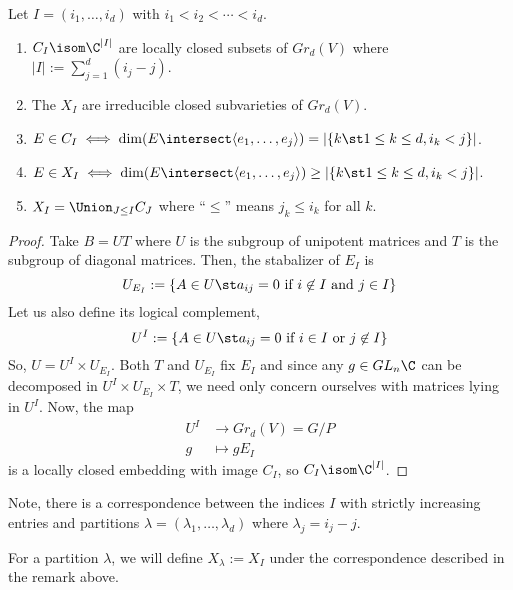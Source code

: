 \documentclass[11pt,leqno,oneside]{amsbook}
\numberwithin{thm}{section}
\newcommand{\Gr}{Gr}
\begin{document}
\begin{prop}
  Let \(I = (i_1, \ldots, i_d)\) with \(i_1 < i_2 < \cdots <
  i_d\). 
  \begin{enumerate}
  \item \(C_I \isom \C^{|I|}\) are locally closed subsets of
    \(\Gr_d(V)\) where \(|I| := \sum_{j=1}^d (i_j-j)\).
  \item The \(X_I\) are irreducible closed subvarieties of
    \(\Gr_d(V)\). 
  \item \(E \in C_I \iff \dim(E \intersect \langle e_1, \ldots, e_j
    \rangle) = |\{k \st 1 \leq k \leq d, i_k < j\}|\).
  \item \(E \in X_I \iff \dim(E \intersect \langle e_1, \ldots, e_j
    \rangle) \geq |\{k \st 1 \leq k \leq d, i_k < j\}|\).
  \item \(X_I = \Union_{J \leq I} C_J\) where ``\(\leq\)'' means \(j_k
    \leq i_k\) for all \(k\).
  \end{enumerate}
\end{prop}
\begin{proof}
  Take \(B = UT\) where \(U\) is the subgroup of unipotent matrices
  and \(T\) is the subgroup of diagonal matrices. Then, the stabalizer
  of \(E_I\) is \[
    U_{E_I} := \{A \in U \st a_{ij} = 0 \text{ if }i \not \in I \text{
    and }j \in I\}
\]
Let us also define its logical complement, \[
  U^I := \{A \in U \st a_{ij} = 0 \text{ if }i \in I \text{ or }j \not
  \in I\}
\]
So, \(U = U^I \times U_{E_I}\). Both \(T\) and \(U_{E_I}\) fix
\(E_I\) and since any \(g \in GL_n \C\) can be decomposed in \(U^I
\times U_{E_I} \times T\), we need only concern ourselves with
matrices lying in \(U^I\). Now, the map
\begin{align*}
  U^I & \to \Gr_d(V) = G/P\\
  g & \mapsto gE_I
\end{align*}
is a locally closed embedding with image \(C_I\), so \(C_I \isom
\C^{|I|}\). 
\end{proof}
\begin{rmk}
  Note, there is a correspondence between the indices \(I\) with
  strictly increasing entries and partitions \(\lambda = (\lambda_1,
  \ldots, 
  \lambda_d)\) where \(\lambda_j = i_j - j\). 
\end{rmk}
\begin{defn}
  For a partition \(\lambda\), we will define \(X_\lambda := X_I\)
  under the correspondence described in the remark above. 
\end{defn}
\end{document}
